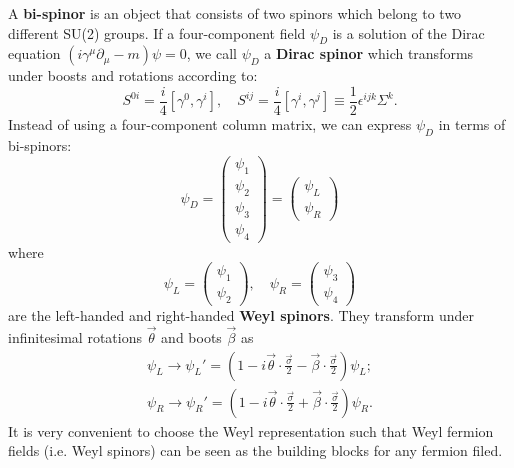\documentclass[12pt]{report}
\begin{document}
A \textbf{bi-spinor} is an object that consists of two spinors which belong to two different SU(2) groups.
If a four-component field $\psi_{D}$ is a solution of the Dirac equation $(i \gamma^{\mu} \partial_{\mu} - m) \psi  = 0$, we call $\psi_{D}$ a \textbf{Dirac spinor} which transforms under boosts and rotations according to:
\begin{equation}
S^{0i} = \frac{i}{4} [\gamma^{0}, \gamma^{i}] , \quad 
S^{ij} = \frac{i}{4} [\gamma^{i}, \gamma^{j}] \equiv \frac{1}{2} \epsilon^{ijk} \Sigma^{k} .
\end{equation}
Instead of using a four-component column matrix, we can express $\psi_{D}$ in terms of bi-spinors:
\begin{equation}
\psi_{D} = \left(\begin{array}{c} \psi_{1} \\ \psi_{2} \\ \psi_{3} \\ \psi_{4} \end{array}\right) = \left(\begin{array}{c} \psi_{L} \\ \psi_{R} \end{array}\right)
\end{equation}
where
\begin{equation}
\psi_{L} = \left(\begin{array}{c} \psi_{1} \\ \psi_{2} \end{array}\right), \quad 
\psi_{R} = \left(\begin{array}{c} \psi_{3} \\ \psi_{4} \end{array}\right)
\end{equation}
are the left-handed and right-handed \textbf{Weyl spinors}.
They transform under infinitesimal rotations $\vec{\theta}$ and boots $\vec{\beta}$ as
\begin{eqnarray}
\psi_{L} \to \psi_{L}' = (1 - i \vec{\theta} \cdot \frac{\vec{\sigma}}{2} - \vec{\beta} \cdot \frac{\vec{\sigma}}{2}) \psi_{L} ;\\
\psi_{R} \to \psi_{R}' = (1 - i \vec{\theta} \cdot \frac{\vec{\sigma}}{2} + \vec{\beta} \cdot \frac{\vec{\sigma}}{2}) \psi_{R} .
\end{eqnarray}
It is very convenient to choose the Weyl representation such that Weyl fermion fields (i.e. Weyl spinors) can be seen as the building blocks for any fermion filed.
\end{document}
